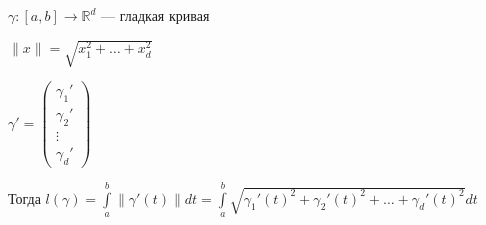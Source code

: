     \begin{theorem}
    
        $\gamma \colon [a,b] \rightarrow \mathbb{R}^d$ --- гладкая кривая

        $\|x\| = \sqrt{x_1^2 + \dots + x_d^2}$

        $\gamma' = 
        \begin{pmatrix}
            \gamma_1' \\
            \gamma_2' \\
            \vdots \\
            \gamma_d'
        \end{pmatrix}$

        Тогда $l(\gamma) = \int\limits_a^b \|\gamma'(t)\|dt = \int\limits_a^b \sqrt{\gamma_1'(t)^2 + \gamma_2'(t)^2 + \dots + \gamma_d'(t)^2} dt$
    
    \end{theorem}


